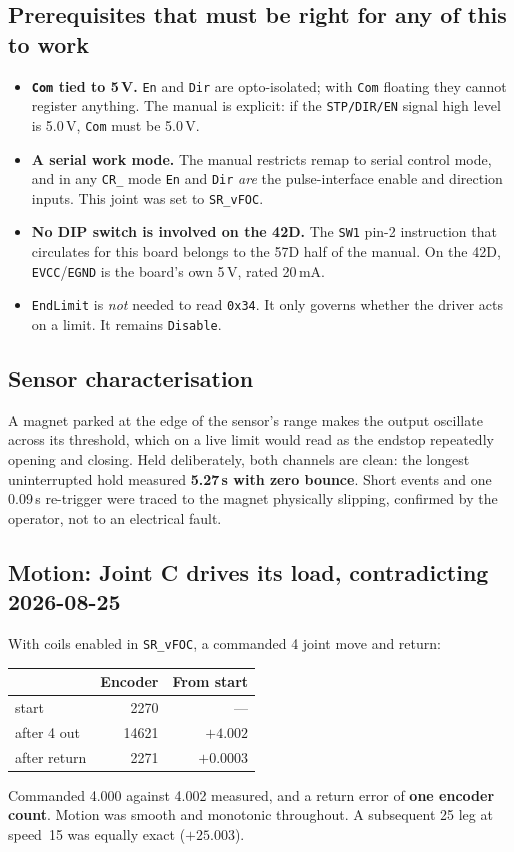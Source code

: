 \documentclass[11pt,letterpaper]{article}
\begin{document}
\subsection{Prerequisites that must be right for any of this to work}
\begin{itemize}
    \item \textbf{\texttt{Com} tied to 5\,V.} \texttt{En} and \texttt{Dir} are
    opto-isolated; with \texttt{Com} floating they cannot register anything.
    The manual is explicit: if the \texttt{STP/DIR/EN} signal high level is
    5.0\,V, \texttt{Com} must be 5.0\,V.
    \item \textbf{A serial work mode.} The manual restricts remap to serial
    control mode, and in any \texttt{CR\_} mode \texttt{En} and \texttt{Dir}
    \emph{are} the pulse-interface enable and direction inputs. This joint was
    set to \texttt{SR\_vFOC}.
    \item \textbf{No DIP switch is involved on the 42D.} The \texttt{SW1}
    pin-2 instruction that circulates for this board belongs to the 57D half of
    the manual. On the 42D, \texttt{EVCC}/\texttt{EGND} is the board's own 5\,V,
    rated 20\,mA.
    \item \texttt{EndLimit} is \emph{not} needed to read \texttt{0x34}. It only
    governs whether the driver acts on a limit. It remains \texttt{Disable}.
\end{itemize}

\subsection{Sensor characterisation}
A magnet parked at the edge of the sensor's range makes the output oscillate
across its threshold, which on a live limit would read as the endstop repeatedly
opening and closing. Held deliberately, both channels are clean: the longest
uninterrupted hold measured \textbf{5.27\,s with zero bounce}. Short events and
one 0.09\,s re-trigger were traced to the magnet physically slipping, confirmed
by the operator, not to an electrical fault.

\subsection{Motion: Joint C drives its load, contradicting 2026-08-25}
With coils enabled in \texttt{SR\_vFOC}, a commanded 4\textdegree{} joint move and
return:
\begin{center}
\begin{tabular}{lrr}
\toprule
 & \textbf{Encoder} & \textbf{From start} \\ \midrule
start          & 2270  & --- \\
after 4\textdegree{} out & 14621 & $+4.002$\textdegree{} \\
after return   & 2271  & $+0.0003$\textdegree{} \\ \bottomrule
\end{tabular}
\end{center}
Commanded 4.000\textdegree{} against 4.002\textdegree{} measured, and a return
error of \textbf{one encoder count}. Motion was smooth and monotonic throughout.
A subsequent 25\textdegree{} leg at speed~15 was equally exact
($+25.003$\textdegree{}).
\end{document}
